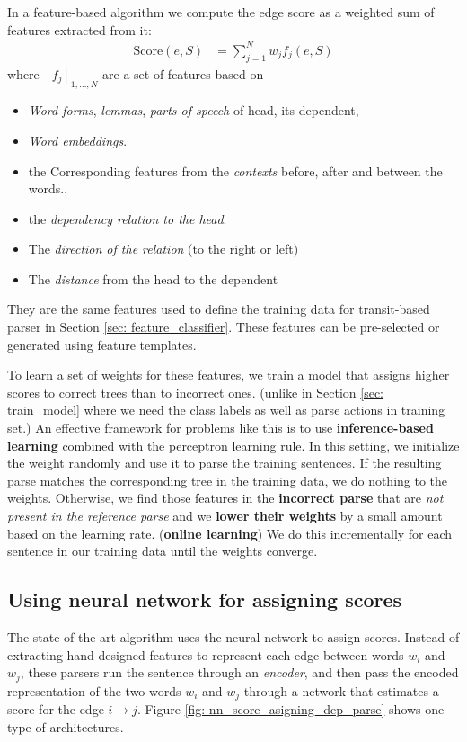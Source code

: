 \documentclass[11pt]{article}
\begin{document}
In a feature-based algorithm we compute the edge score as a weighted sum of features extracted from it:
\begin{align*}
\text{Score}(e, S) &= \sum_{j=1}^{N}w_{j}f_{j}(e, S)
\end{align*} where $[f_{j}]_{1,\ldots,N}$ are a set of features based on 
\begin{itemize}
\item \emph{Word forms}, \emph{lemmas},  \emph{parts of speech} of head, its dependent,
\item \emph{Word embeddings}.
\item the Corresponding features from the \emph{contexts} before, after and between the words., 
\item the \emph{dependency relation to the head}.
\item The \emph{direction of the relation} (to the right or left)
\item The \emph{distance} from the head to the dependent
\end{itemize}
 They are the same features used to define the training data for transit-based parser in Section \ref{sec: feature_classifier}. These features can be pre-selected or generated using feature templates. 

To learn a set of weights for these features, we train a model that assigns higher scores to correct trees than to incorrect ones. (unlike in Section \ref{sec: train_model} where we need the class labels as well as parse actions in training set.) An effective framework for problems like this is to use \textbf{inference-based learning} combined with the perceptron learning rule. In this setting, we initialize the weight randomly and use it to parse the training sentences. If the resulting parse matches the corresponding tree in the training data, we do nothing to the weights. Otherwise, we find those features in the \textbf{incorrect parse} that are \emph{not present in the reference parse} and we \textbf{lower their weights} by a small amount based on the learning rate. (\textbf{online learning})  We do this incrementally for each sentence in our training data until the weights converge.

\subsection{Using neural network for assigning scores}
The state-of-the-art algorithm uses the neural network to assign scores. Instead of extracting hand-designed features to represent each edge between words $w_i$ and $w_j$, these parsers run the sentence through an \emph{encoder}, and then pass the encoded representation of the two words $w_i$ and $w_j$ through a network that estimates a score for the edge $i \rightarrow j$. Figure \ref{fig: nn_score_asigning_dep_parse} shows one type of architectures. 
\end{document}
